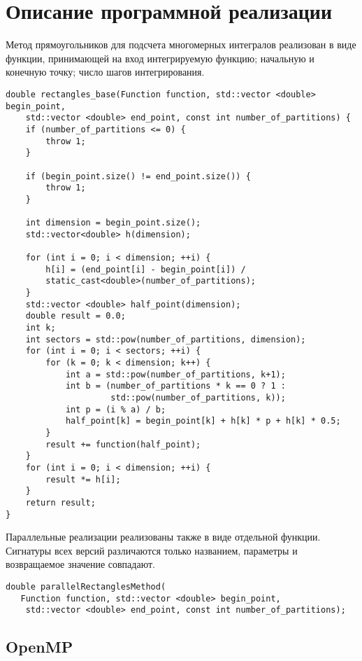 \documentclass{report}
\begin{document}
\section*{Описание программной реализации}
Метод прямоугольников для подсчета многомерных интегралов реализован в виде функции, принимающей на вход интегрируемую функцию; начальную и конечную точку; число шагов интегрирования.
\begin{lstlisting}
double rectangles_base(Function function, std::vector <double> begin_point,
    std::vector <double> end_point, const int number_of_partitions) {
    if (number_of_partitions <= 0) {
        throw 1;
    }

    if (begin_point.size() != end_point.size()) {
        throw 1;
    }

    int dimension = begin_point.size();
    std::vector<double> h(dimension);

    for (int i = 0; i < dimension; ++i) {
        h[i] = (end_point[i] - begin_point[i]) /
        static_cast<double>(number_of_partitions);
    }
    std::vector <double> half_point(dimension);
    double result = 0.0;
    int k;
    int sectors = std::pow(number_of_partitions, dimension);
    for (int i = 0; i < sectors; ++i) {
        for (k = 0; k < dimension; k++) {
            int a = std::pow(number_of_partitions, k+1);
            int b = (number_of_partitions * k == 0 ? 1 :
                     std::pow(number_of_partitions, k));
            int p = (i % a) / b;
            half_point[k] = begin_point[k] + h[k] * p + h[k] * 0.5;
        }
        result += function(half_point);
    }
    for (int i = 0; i < dimension; ++i) {
        result *= h[i];
    }
    return result;
}
\end{lstlisting}
\par Параллельные реализации реализованы также в виде отдельной функции. Сигнатуры всех версий различаются только названием, параметры и возвращаемое значение совпадают.
\begin{lstlisting}
double parallelRectanglesMethod(
   Function function, std::vector <double> begin_point,
    std::vector <double> end_point, const int number_of_partitions);
\end{lstlisting}

\subsection*{OpenMP}
\end{document}
